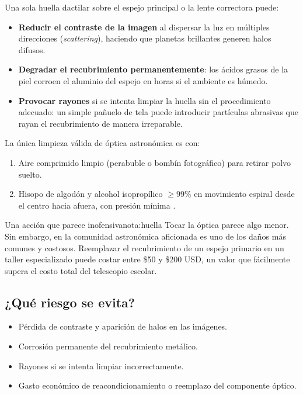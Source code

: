 \documentclass[12pt,oneside]{book}
\begin{document}
Una sola huella dactilar sobre el espejo principal o la lente correctora puede:

\begin{itemize}[leftmargin=1.5em]
    \item \textbf{Reducir el contraste de la imagen} al dispersar la luz en múltiples
          direcciones (\emph{scattering}), haciendo que planetas brillantes generen
          halos difusos.
    \item \textbf{Degradar el recubrimiento permanentemente}: los ácidos grasos
          de la piel corroen el aluminio del espejo en horas si el ambiente es húmedo.
    \item \textbf{Provocar rayones} si se intenta limpiar la huella sin el procedimiento
          adecuado: un simple pañuelo de tela puede introducir partículas abrasivas que
          rayan el recubrimiento de manera irreparable.
\end{itemize}

La única limpieza válida de óptica astronómica es con:

\begin{enumerate}[leftmargin=1.5em]
    \item Aire comprimido limpio (perabuble o bombín fotográfico) para retirar polvo suelto.
    \item Hisopo de algodón y alcohol isopropílico $\geq 99\%$ en movimiento espiral
          desde el centro hacia afuera, con presión mínima \cite{thompson2005}.
\end{enumerate}

\begin{nota}{Una acción que parece inofensiva}{nota:huella}
    Tocar la óptica parece algo menor. Sin embargo, en la comunidad astronómica
    aficionada es uno de los daños más comunes y costosos. Reemplazar el recubrimiento
    de un espejo primario en un taller especializado puede costar entre \$50 y \$200
    USD, un valor que fácilmente supera el costo total del telescopio escolar.
\end{nota}

\subsection{¿Qué riesgo se evita?}

\begin{itemize}[leftmargin=1.5em]
    \item Pérdida de contraste y aparición de halos en las imágenes.
    \item Corrosión permanente del recubrimiento metálico.
    \item Rayones si se intenta limpiar incorrectamente.
    \item Gasto económico de reacondicionamiento o reemplazo del componente óptico.
\end{itemize}
\end{document}
